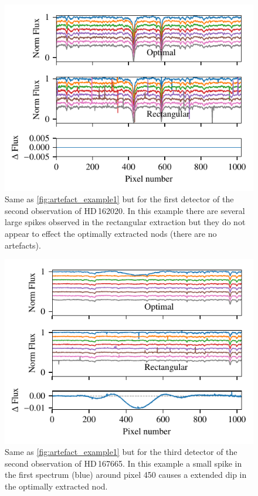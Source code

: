 \begin{figure}
    \centering
    \includegraphics[width=0.7\linewidth]{figures/appendix/bp_plots/rescaled_extraction_comparision_HD162020-2_chip_1}
    \caption[]{Same as \cref{fig:artefact_example1} but for the first detector of the second observation of {HD\,162020}.
        In this example there are several large spikes observed in the rectangular extraction but they do not appear to effect the optimally extracted nods (there are no artefacts).}
    \label{fig:artefact_example2}
\end{figure}
\begin{figure}
    \centering
    \includegraphics[width=0.7\linewidth]{figures/appendix/bp_plots/extraction_comparision_HD167665-1b_chip_3}
    \caption[]{Same as \cref{fig:artefact_example1} but for the third detector of the second observation of {HD\,167665}.
        In this example a small spike in the first spectrum (blue) around pixel 450 causes a extended dip in the optimally extracted nod.}
    \label{fig:artefact_example3}
\end{figure}
